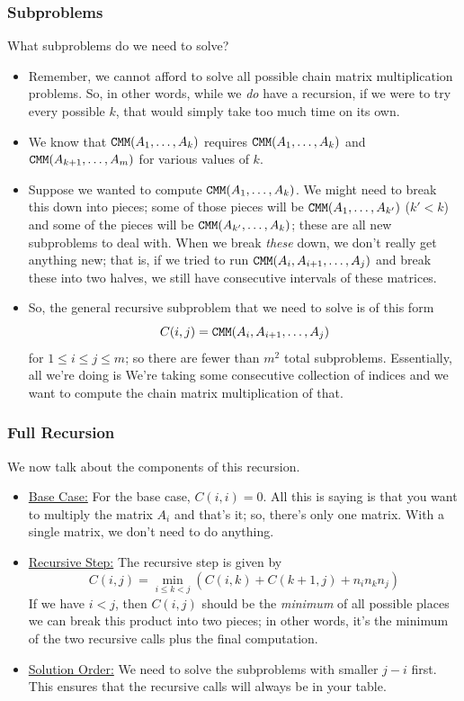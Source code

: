 \documentclass[letterpaper]{article}
\begin{document}
\subsubsection{Subproblems}
What subproblems do we need to solve? 
\begin{itemize}
    \item Remember, we cannot afford to solve all possible chain matrix multiplication problems. So, in other words, while we \emph{do} have a recursion, if we were to try every possible $k$, that would simply take too much time on its own. 
    \item We know that $\texttt{CMM}(A_1, \dots, A_k)$ requires $\texttt{CMM}(A_1, \dots, A_k)$ and $\texttt{CMM}(A_{k + 1}, \dots, A_m)$ for various values of $k$.
    \item Suppose we wanted to compute $\texttt{CMM}(A_1, \dots, A_k)$. We might need to break this down into pieces; some of those pieces will be $\texttt{CMM}(A_1, \dots, A_{k'})$ ($k' < k$) and some of the pieces will be $\texttt{CMM}(A_{k'}, \dots, A_k)$; these are all new subproblems to deal with. When we break \emph{these} down, we don't really get anything new; that is, if we tried to run $\texttt{CMM}(A_i, A_{i + 1}, \dots, A_{j})$ and break these into two halves, we still have consecutive intervals of these matrices. 
    \item So, the general recursive subproblem that we need to solve is of this form
    \[C(i, j) = \texttt{CMM}(A_i, A_{i + 1}, \dots, A_{j})\]
    for $1 \leq i \leq j \leq m$; so there are fewer than $m^2$ total subproblems. Essentially, all we're doing is We're taking some consecutive collection of indices and we want to compute the chain matrix multiplication of that. 
\end{itemize}

\subsubsection{Full Recursion}
We now talk about the components of this recursion. 
\begin{itemize}
    \item \underline{Base Case:} For the base case, $C(i, i) = 0$. All this is saying is that you want to multiply the matrix $A_i$ and that's it; so, there's only one matrix. With a single matrix, we don't need to do anything.
    \item \underline{Recursive Step:} The recursive step is given by 
    \[C(i, j) = \min_{i \leq k < j} \left(C(i, k) + C(k + 1, j) + n_i n_k n_j\right)\]
    If we have $i < j$, then $C(i, j)$ should be the \emph{minimum} of all possible places we can break this product into two pieces; in other words, it's the minimum of the two recursive calls plus the final computation. 
    \item \underline{Solution Order:} We need to solve the subproblems with smaller $j - i$ first. This ensures that the recursive calls will always be in your table.   
\end{itemize}
\end{document}
